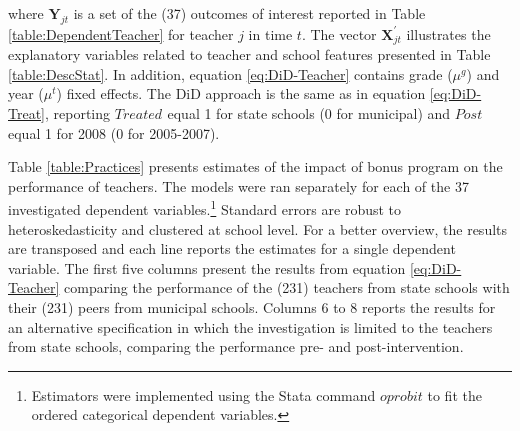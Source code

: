 \documentclass[a4paper, 12pt]{article}
\begin{document}
where $\mathbf{Y}_{jt}$ is a set of the (37) outcomes of interest reported in Table \ref{table:DependentTeacher} for teacher $j$ in time $t$. The vector $\mathbf{X}_{jt}^{\prime}$ illustrates the explanatory variables related to teacher and school features presented in Table \ref{table:DescStat}. In addition, equation \eqref{eq:DiD-Teacher} contains grade ($\mu^{g}$) and year ($\mu^t$) fixed effects. The DiD approach is the same as in equation \eqref{eq:DiD-Treat}, reporting $Treated_{}$ equal 1 for state schools (0 for municipal) and $Post_{}$ equal 1 for 2008 (0 for 2005-2007).


Table \ref{table:Practices} presents estimates of the impact of bonus program on the performance of teachers. The models were ran separately for each of the 37 investigated dependent variables.\footnote{Estimators were implemented using the Stata command $oprobit$ to fit the ordered categorical dependent variables.}  Standard errors are robust to heteroskedasticity and clustered at school level. For a better overview, the results are transposed and each line reports the estimates for a single dependent variable. The first five columns present the results from equation \eqref{eq:DiD-Teacher} comparing the performance of the (231) teachers from state schools with their (231) peers from municipal schools. Columns 6 to 8 reports the results for an alternative specification in which the investigation is limited to the teachers from state schools, comparing the performance pre- and post-intervention.






\vspace{15pt}

\end{document}
